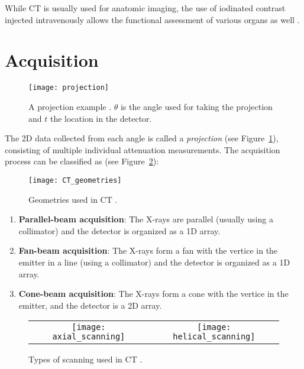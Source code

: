 While CT is usually used for anatomic imaging, the use of
iodinated contrast injected intravenously allows the functional
assessment of various organs as well \cite{bushberg2011essential}.

\section{Acquisition}

\begin{figure}
  \centering
  \texttt{[image: projection]}
  \caption{A projection example \cite{takase2025CT}. $\theta$ is the
    angle used for taking the projection and $t$ the location in
    the detector.\label{fig:projection}}
\end{figure}

The 2D data collected from each angle is called a \emph{projection}
(see Figure~\ref{fig:projection}), consisting of multiple individual
attenuation measurements. The acquisition process can be classified as
(see Figure~\ref{fig:CT_geometries}):

\begin{figure}
  \centering
  \texttt{[image: CT\_geometries]}
  \caption{Geometries used in CT \cite{takase2025CT}.\label{fig:CT_geometries}}
\end{figure}

\begin{enumerate}
\item \textbf{Parallel-beam acquisition}: The X-rays are parallel
  (usually using a collimator) and the detector is organized as a 1D
  array.

\item \textbf{Fan-beam acquisition}: The X-rays form a fan with the vertice in the emitter
  in a line (using a collimator) and the detector is organized as a 1D
  array.

\item \textbf{Cone-beam acquisition}: The X-rays form a cone with the
  vertice in the emitter, and the detector is a 2D array.
  
\end{enumerate}

\begin{figure}
  \centering
  \begin{tabular}{cc}
    \texttt{[image: axial\_scanning]} & \texttt{[image: helical\_scanning]}
  \end{tabular}
  \caption{Types of scanning used in CT \cite{abdulla2025acquiring1}.\label{fig:scannings}}
\end{figure}

